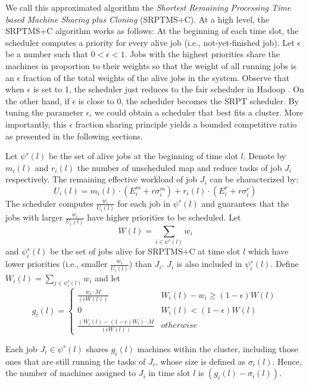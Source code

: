 \documentclass[10pt,conference,compsocconf,letterpaper]{IEEEtran}
\begin{document}
We call this approximated algorithm the \textit{Shortest Remaining Processing Time based Machine Sharing plus Cloning} (SRPTMS+C).
At a high level, the SRPTMS+C algorithm works as follows: At the beginning of each time slot, the scheduler computes a priority for every alive job (i.e., not-yet-finished job). Let $\epsilon$ be a number such that $0 < \epsilon < 1$.  Jobs with the highest priorities share the machines in proportion to their weights so that the weight of all running jobs is an $\epsilon$ fraction of the total weights of  the alive jobs in the system. Observe that when $\epsilon$ is set to 1, the scheduler just reduces to the fair scheduler in  Hadoop \cite{hadoop}. On the other hand,  if $\epsilon$ is close to 0, the scheduler becomes the SRPT scheduler. By tuning the parameter $\epsilon$, we could obtain a scheduler
that best fits a cluster.  More importantly, this $\epsilon$ fraction sharing principle yields a bounded competitive ratio as presented in the following sections.


Let $\psi^s (l)$ be the set of alive jobs at the beginning of time slot $l$. Denote by $m_i(l)$ and $r_i(l)$ the number of unscheduled map and reduce tasks of job $J_i$ respectively. The remaining effective workload of job $J_i$ can be characterized by:
\begin{equation}
U_i(l) = m_i(l)\cdot(E^m_i + r\sigma^m_i) + r_i(l)\cdot(E^r_i + r\sigma^r_i)
\end{equation}
The scheduler computes $\frac{w_i}{U_i(l)}$ for each job in $\psi^s (l)$ and guarantees that the jobs with larger $\frac{w_i}{U_i(l)}$ have higher priorities to be scheduled. Let
\begin{equation}
\label{sum-weight}
W(l) = \sum_{i \in \psi^s (l)}w_i
\end{equation}
and $\psi_i^s (l)$ be the set of jobs alive for SRPTMS+C at time slot $l$ which have lower priorities (i.e., smaller $\frac{w_i}{U_i(l)}$) than $J_i$. $J_i$ is also included in $\psi_i^s (l)$. Define $W_i(l) = \sum_{j \in \psi_i^s (l)}w_i$
and let
 $$g_i(l) = \left\{\begin{array}{cc}
\frac{w_i \cdot M}{(\epsilon W(l))} & W_i(l) - w_i \geq (1-\epsilon)W(l) \\
0   & W_i(l) < (1-\epsilon)W(l) \\
\frac{(W_i(l) - (1-\epsilon)W_l)\cdot M}{(\epsilon W(l))} & otherwise
\end{array}\right.$$

Each job $J_i \in \psi^s (l)$ shares $g_i(l)$ machines within the cluster, including those ones that are still running the tasks of $J_i$, whose size is defined as $\sigma_i(l)$. Hence, the number of machines assigned  to $J_i$ in time slot $l$ is $(g_i(l) - \sigma_i(l))$.
\end{document}
